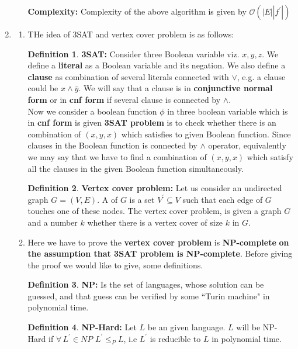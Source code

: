 \documentclass[12pt,a4paper,final]{article}
\theoremstyle{definition}
\newtheorem{definition}{Definition}
\begin{document}
\begin{enumerate}
\begin{enumerate}
\textbf{Complexity: }Complexity of the above algorithm is given by $\mathcal{O}(|E||f^\prime|)$

\end{enumerate}




\item
\begin{enumerate}
\item
THe idea of 3SAT and vertex cover problem is as follows:
\begin{definition}
\textbf{3SAT: }Consider three Boolean variable viz. $x,y,z$. We define a \textbf{literal} as a Boolean variable and its negation. We also define a \textbf{clause} as combination of several literals connected with $\lor$, e.g. a clause could be $x\land \bar{y}$. We will say that a clause is in \textbf{conjunctive normal form} or in \textbf{cnf form} if several clause is connected by $\land$.\\
Now we consider a boolean function $\phi$ in three boolean variable which is in \textbf{cnf form} is given  \textbf{3SAT problem} is to check whether there is an combination of $(x,y,x)$ which satisfies to given Boolean function. Since clauses in the Boolean function is connected by $\land$ operator, equivalently we may say that we have to find a combination of $(x,y,x)$ which satisfy all the clauses in the given Boolean function simultaneously.\\
\end{definition}

\begin{definition}
\textbf{Vertex cover problem: }Let us consider an undirected graph $G=(V,E)$. A of $G$ is a set $V^\prime \subseteq V$ such that each edge of $G$ touches one of these nodes. The vertex cover problem, is  given a graph $G$ and a number $k$ whether there is a vertex cover of size $k$ in $G$.
\end{definition}

\item
Here we have to prove the \textbf{vertex cover problem} is \textbf{NP-complete} \textbf{on the assumption that 3SAT problem is NP-complete}. Before giving the proof we would like to give, some definitions.
\begin{definition}
\textbf{NP: }Is the set of languages, whose solution can be guessed, and that guess can be verified by some ``Turin machine" in polynomial time.
\end{definition}

\begin{definition}
\textbf{NP-Hard: }Let $L$ be an given language. $L$ will be NP-Hard if $\forall \, L^\prime \in NP \,\, L^\prime \leq_{P} L$, i.e $L^\prime$ is reducible to $L$ in polynomial time.
\end{definition}


\end{enumerate}
\end{enumerate}
\end{document}
